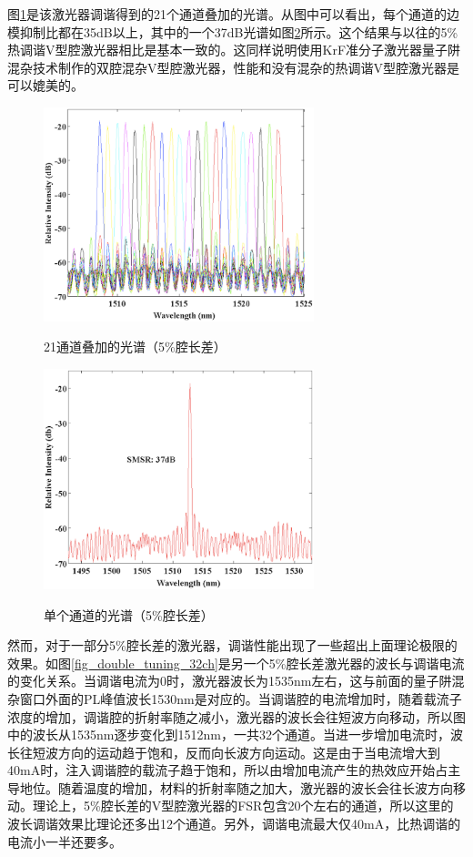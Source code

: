 \documentclass{ZJUthesis}
\begin{document}
图\ref{fig_double_spectra_p5}是该激光器调谐得到的21个通道叠加的光谱。从图中可以看出，每个通道的边模抑制比都在35dB以上，其中的一个37dB光谱如图\ref{fig_double_spectrum_p5}所示。这个结果与以往的5\%热调谐V型腔激光器相比是基本一致的。这同样说明使用KrF准分子激光器量子阱混杂技术制作的双腔混杂V型腔激光器，性能和没有混杂的热调谐V型腔激光器是可以媲美的。

\begin{figure}[!ht]
  \centering
  \includegraphics[width=0.7\textwidth]{./Pictures/double_spectra_p5.eps}\\
  \caption{21通道叠加的光谱（5\%腔长差）}
  \label{fig_double_spectra_p5}
\end{figure}

\begin{figure}[!ht]
  \centering
  \includegraphics[width=0.7\textwidth]{./Pictures/double_spectrum_p5.eps}\\
  \caption{单个通道的光谱（5\%腔长差）}
  \label{fig_double_spectrum_p5}
\end{figure}

然而，对于一部分5\%腔长差的激光器，调谐性能出现了一些超出上面理论极限的效果。如图\ref{fig_double_tuning_32ch}是另一个5\%腔长差激光器的波长与调谐电流的变化关系。当调谐电流为0时，激光器波长为1535nm左右，这与前面的量子阱混杂窗口外面的PL峰值波长1530nm是对应的。当调谐腔的电流增加时，随着载流子浓度的增加，调谐腔的折射率随之减小，激光器的波长会往短波方向移动，所以图中的波长从1535nm逐步变化到1512nm，一共32个通道。当进一步增加电流时，波长往短波方向的运动趋于饱和，反而向长波方向运动。这是由于当电流增大到40mA时，注入调谐腔的载流子趋于饱和，所以由增加电流产生的热效应开始占主导地位。随着温度的增加，材料的折射率随之加大，激光器的波长会往长波方向移动。理论上，5\%腔长差的V型腔激光器的FSR包含20个左右的通道，所以这里的波长调谐效果比理论还多出12个通道。另外，调谐电流最大仅40mA，比热调谐的电流小一半还要多。
\end{document}
